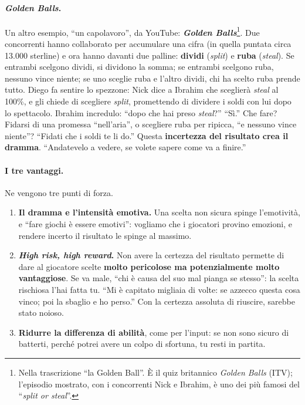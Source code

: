 \paragraph{\emph{Golden Balls}.} Un altro esempio, ``un capolavoro'', da YouTube:
\textbf{\emph{Golden Balls}}\footnote{Nella trascrizione ``la Golden Ball''. È il quiz
britannico \emph{Golden Balls} (ITV); l'episodio mostrato, con i concorrenti Nick e Ibrahim, è
uno dei più famosi del ``\emph{split or steal}''.}. Due concorrenti hanno collaborato per
accumulare una cifra (in quella puntata circa 13.000 sterline) e ora hanno davanti due
palline: \textbf{dividi} (\emph{split}) e \textbf{ruba} (\emph{steal}). Se entrambi scelgono
dividi, si dividono la somma; se entrambi scelgono ruba, nessuno vince niente; se uno sceglie
ruba e l'altro dividi, chi ha scelto ruba prende tutto. Diego fa sentire lo spezzone: Nick
dice a Ibrahim che sceglierà \emph{steal} al 100\%, e gli chiede di scegliere \emph{split},
promettendo di dividere i soldi con lui dopo lo spettacolo. Ibrahim incredulo: ``dopo che hai
preso \emph{steal}?'' ``Sì.'' Che fare? Fidarsi di una promessa ``nell'aria'', o scegliere
ruba per ripicca, ``e nessuno vince niente''? ``Fidati che i soldi te li do.'' Questa
\textbf{incertezza del risultato crea il dramma}. ``Andatevelo a vedere, se volete sapere come
va a finire.''

\paragraph{I tre vantaggi.} Ne vengono tre punti di forza.
\begin{enumerate}
  \item \textbf{Il dramma e l'intensità emotiva.} Una scelta non sicura spinge l'emotività,
        e ``fare giochi è essere emotivi'': vogliamo che i giocatori provino emozioni, e
        rendere incerto il risultato le spinge al massimo.
  \item \textbf{\emph{High risk, high reward}.} Non avere la certezza del risultato permette
        di dare al giocatore scelte \textbf{molto pericolose ma potenzialmente molto
        vantaggiose}. Se va male, ``chi è causa del suo mal pianga se stesso'': la scelta
        rischiosa l'hai fatta tu. ``Mi è capitato migliaia di volte: se azzecco questa cosa
        vinco; poi la sbaglio e ho perso.'' Con la certezza assoluta di riuscire, sarebbe
        stato noioso.
  \item \textbf{Ridurre la differenza di abilità}, come per l'input: se non sono sicuro di
        batterti, perché potrei avere un colpo di sfortuna, tu resti in partita.
\end{enumerate}

